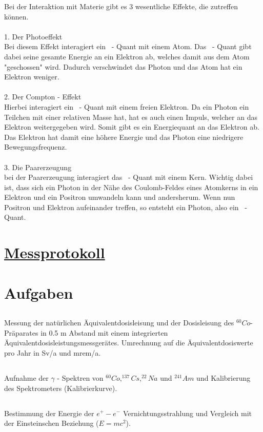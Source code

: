 \documentclass[11pt,a4paper]{article}
\begin{document}
Bei der Interaktion mit Materie gibt es 3 wesentliche Effekte, die zutreffen können.
\\\\
1. Der Photoeffekt \\
Bei diesem Effekt interagiert ein \gamma~- Quant mit einem Atom. Das \gamma~-
Quant gibt dabei seine gesamte Energie an ein Elektron ab, welches damit aus dem Atom
"geschossen" wird. Dadurch verschwindet das Photon und das Atom hat ein Elektron
weniger.
\\\\
2. Der Compton - Effekt \\
Hierbei interagiert ein \gamma~- Quant mit einem freien Elektron. Da ein Photon ein
Teilchen mit einer relativen Masse hat, hat es auch einen Impuls, welcher an das
Elektron weitergegeben wird. Somit gibt es ein Energiequant an das Elektron ab. Das
Elektron hat damit eine höhere Energie und das Photon eine niedrigere
Bewegungsfrequenz.
\\\\
3. Die Paarerzeugung \\
bei der Paarerzeugung interagiert das \gamma~- Quant mit einem Kern. Wichtig dabei
ist, dass sich ein Photon in der Nähe des Coulomb-Feldes eines Atomkerns in ein
Elektron und ein Positron umwandeln kann und andersherum. Wenn nun Positron und
Elektron aufeinander treffen, so entsteht ein Photon, also ein \gamma~- Quant.
\newpage
\section{\underline{Messprotokoll}}
\section{Aufgaben}
\subsection{} 
Messung  der natürlichen Äquivalentdosisleisung und der Dosisleisung 
des $^{60}Co$-Präparates in 0.5 m Abstand mit einem integrierten Äquivalentdosisleistungsmessgerätes.
Umrechnung auf die Äquivalentdosiswerte pro Jahr in Sv/a und mrem/a.
\subsection{} 
Aufnahme der $\gamma$ - Spektren von $^{60}Co, ^{137}Cs, ^{22}Na$ und $^{241}Am$ und Kalibrierung
des Spektrometers (Kalibrierkurve).
\subsection{}
Bestimmung der Energie der $e^+-e^-$ Vernichtungsstrahlung und Vergleich 
mit der Einsteinschen Beziehung ($E=mc^2$).
\end{document}
